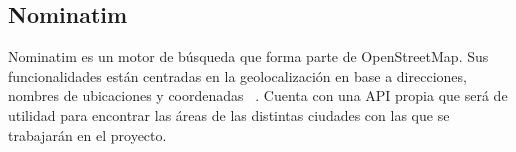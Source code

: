 \subsection{Nominatim}
Nominatim es un motor de búsqueda que forma parte de OpenStreetMap. Sus funcionalidades están centradas en la 
geolocalización en base a direcciones, nombres de ubicaciones y coordenadas ~\cite{nominatimNominatim}. Cuenta con una API propia
que será de utilidad para encontrar las áreas de las distintas ciudades con las que se trabajarán en el proyecto.

